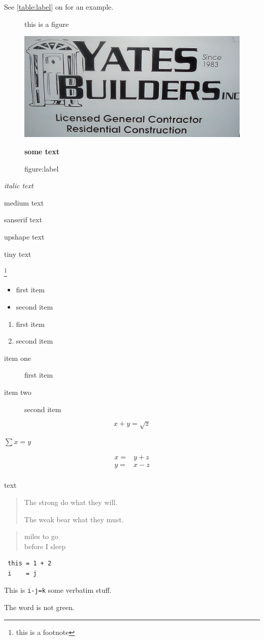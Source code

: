 \documentclass{book}
\begin{document}
\pagebreak

See \ref{table:label} on \pageref{table:label} for an example.


\begin{figure}
\caption{this is a figure}\caption{figure:label}
\includegraphics{somefile}

\textbf{some text}
\end{figure}



\textit{italic text}

\textmd{medium text}

\textsf{sanserif text}

\textup{upshape text}

\tiny{tiny text}

\footnote{this is a footnote}

\footnotemark{}

\begin{itemize}
\item first item
\item second item
\end{itemize}


\begin{enumerate}
\item first item
\item second item
\end{enumerate}


\begin{description}
\item[item one] first item
\item[item two] second item
\end{description}

\[
x + y = \sqrt{z}
\]

$\sum x = y$

\begin{eqnarray*}
 x = & y+z\\
 y = & x - z\\
 \end{eqnarray*}

text\par

\begin{quotation}
The strong do what they will.

The weak bear what they must.
\end{quotation}

\begin{verse}
miles to go\\
before I sleep
\end{verse}

\begin{verbatim}
 this = 1 + 2
 i    = j
\end{verbatim}

This is \verb+i-j=k+ some verbatim stuff.

The word is \color{red} not green.
\end{document}
